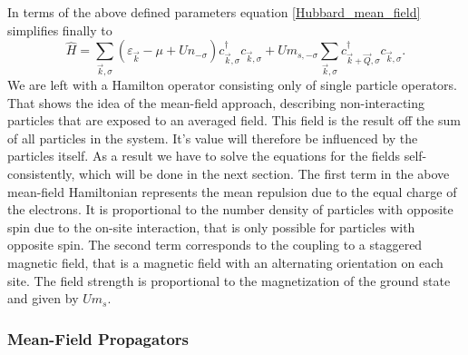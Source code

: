 \documentclass[a4paper,12pt]{report}
\begin{document}
In terms of the above defined parameters equation \ref{Hubbard_mean_field} simplifies finally to
\begin{equation}
 \hat H = \sum_{\vec k, \sigma} \left( \varepsilon_{\vec k } - \mu + U n_{-\sigma} \right) c^{\dagger}_{\vec k, \sigma} c_{\vec k ,\sigma}
	  + U m_{s,-\sigma} \sum_{\vec k, \sigma} c^{\dagger}_{\vec k + \vec Q, \sigma} c_{\vec k, \sigma}.
\end{equation}
%
%
%
We are left with a Hamilton operator consisting only of single particle operators. 
That shows the idea of the mean-field approach, describing non-interacting particles that are exposed to an averaged field.
This field is the result off the sum of all particles in the system. It's value will therefore be influenced by the particles itself.
As a result we have to solve the equations for the fields self-consistently, which will be done in the next section. 
The first term in the above mean-field Hamiltonian represents the mean repulsion due to the equal charge of the electrons.
It is proportional to the number density of particles with opposite spin due to the on-site interaction, that is only possible for particles with opposite spin.
The second term corresponds to the coupling to a staggered magnetic field, that is a magnetic field with an alternating orientation on each site. 
The field strength is proportional to the magnetization of the ground state and given by $Um_s$.

\subsubsection{Mean-Field Propagators}
\end{document}
